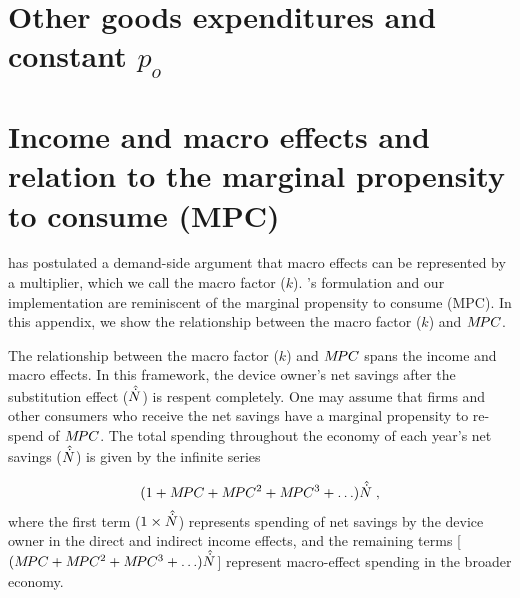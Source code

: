 \documentclass[12pt]{article}\usepackage[]{graphicx}\usepackage[]{xcolor}
\begin{document}




\section{Other goods expenditures and constant $p_o$}
\label{sec:other_goods_expenditures}





\section{Income and macro effects and relation to the
marginal propensity to consume (MPC)}
\label{sec:income_macro_mpc}



\citet{Borenstein:2015aa} has postulated a demand-side argument that macro effects 
can be represented by a multiplier, which we call the macro factor ($k$).
\citeauthor{Borenstein:2015aa}'s formulation and our implementation 
are reminiscent of the marginal propensity to consume (MPC).
In this appendix, we show the relationship between the macro factor ($k$) and $M\!PC$.

The relationship between the macro factor ($k$) and $M\!PC$ spans
the income and macro effects.
In this framework, the device owner's net savings 
after the substitution effect ($\hat{\dot{N}}$) is respent completely.
One may assume that firms and other consumers who receive the net savings have a 
marginal propensity to re-spend of $M\!PC$.
The total spending throughout the economy of each year's net savings ($\hat{\dot{N}}$)
is given by the infinite series

\begin{equation} \label{eq:infinite_series_spending}
  (1 + M\!PC + M\!PC^2 + M\!PC^3 + \ldots) \hat{\dot{N}} \; ,
\end{equation}
%
where the first term ($1 \times \hat{\dot{N}}$) represents spending of net savings by the device owner
in the direct and indirect income effects, and
the remaining terms 
[$(M\!PC + M\!PC^2 + M\!PC^3 + \ldots) \hat{\dot{N}}$]
represent macro-effect spending in the broader economy.
\end{document}
